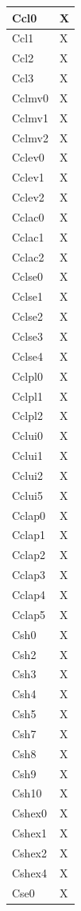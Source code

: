\begin{footnotesize}
\begin{longtable}{|p{}|p{}|}
Ccl0 &X\\\hline 
Ccl1 &X\\\hline 
Ccl2 &X\\\hline 
Ccl3 &X\\\hline 
Cclmv0 &X\\\hline 
Cclmv1 &X\\\hline 
Cclmv2 &X\\\hline 
Cclev0 &X\\\hline
Cclev1 &X\\\hline 
Cclev2 &X\\\hline 
Cclac0 &X\\\hline 
Cclac1 &X\\\hline 
Cclac2 &X\\\hline 
Cclse0 &X\\\hline 
Cclse1 &X\\\hline 
Cclse2 &X\\\hline 
Cclse3 &X\\\hline 
Cclse4 &X\\\hline 
Cclpl0 &X\\\hline 
Cclpl1 &X\\\hline 
Cclpl2 &X\\\hline 
Cclui0 &X\\\hline 
Cclui1 &X\\\hline 
Cclui2 &X\\\hline
Cclui5 &X\\\hline  
Cclap0  &X\\\hline 
Cclap1 &X\\\hline 
Cclap2  &X\\\hline 
Cclap3 &X \\\hline 
Cclap4 &X \\\hline 
Cclap5 &X \\\hline 
Csh0 &X\\\hline 
Csh2 &X\\\hline 
Csh3 &X\\\hline 
Csh4 &X\\\hline 
Csh5 &X\\\hline 
Csh7 &X\\\hline 
Csh8 &X\\\hline 
Csh9 &X\\\hline 
Csh10 &X\\\hline 
Cshex0 &X\\\hline 
Cshex1 &X\\\hline 
Cshex2 &X\\\hline 
Cshex4 &X\\\hline 
Cse0 &X\\\hline 

\end{longtable}
\end{footnotesize}
